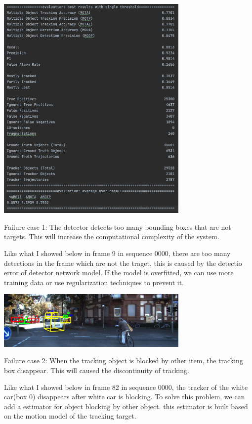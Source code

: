\documentclass[11pt]{article}
\begin{document}
\begin{center}
    \includegraphics[width=0.7\textwidth]{./fig/Q7_result.png}
\end{center}

Failure case 1: The detector detects too many bounding boxes that are not targets. This will increase the computational complexity of the system.

Like what I showed below in frame 9 in sequence 0000, there are too many detections in the frame which are not the traget, this is caused by the detectio error of detector network model. If the model is overfitted, we can use more training data or use regularization techniques to prevent it.

\begin{center}
    \includegraphics[width=0.7\textwidth]{./fig/Q6_9.jpg}
\end{center}

Failure case 2: When the tracking object is blocked by other item, the tracking box disappear. This will caused the discontinuity of tracking.

Like what I showed below in frame 82 in sequence 0000, the tracker of the white car(box 0) disappears after white car is blocking. To solve this problem, we can add a estimator for object blocking by other object. this estimator is built based on the motion model of the tracking target.
\end{document}
